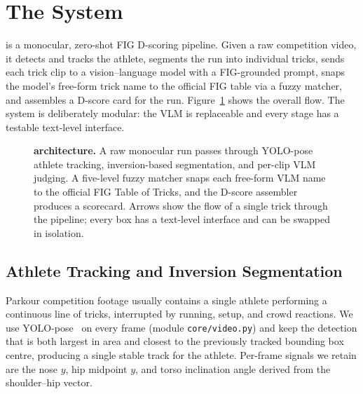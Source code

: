 \section{The \sys{} System}
\label{sec:system}

\sys{} is a monocular, zero-shot FIG D-scoring pipeline. Given a raw
competition video, it detects and tracks the athlete, segments the run into
individual tricks, sends each trick clip to a vision--language model with
a FIG-grounded prompt, snaps the model's free-form trick name to the official
FIG table via a fuzzy matcher, and assembles a D-score card for the run.
Figure~\ref{fig:architecture} shows the overall flow. The system is
deliberately modular: the VLM is replaceable and every stage has a testable
text-level interface.

\begin{figure}[t]
  \centering
  
  \caption{\textbf{\sys{} architecture.} A raw monocular run passes through
  YOLO-pose athlete tracking, inversion-based segmentation, and per-clip VLM
  judging. A five-level fuzzy matcher snaps each free-form VLM name to the
  official FIG Table of Tricks, and the D-score assembler produces a
  scorecard. Arrows show the flow of a single trick through the pipeline;
  every box has a text-level interface and can be swapped in isolation.}
  \label{fig:architecture}
\end{figure}

\subsection{Athlete Tracking and Inversion Segmentation}
\label{sec:system:segmentation}

Parkour competition footage usually contains a single athlete performing a
continuous line of tricks, interrupted by running, setup, and crowd
reactions. We use YOLO-pose~\cite{jocher2023yolo} on every frame (module
\texttt{core/video.py}) and keep the detection that is both largest in area
and closest to the previously tracked bounding box centre, producing a
single stable track for the athlete. Per-frame signals we retain are the
nose $y$, hip midpoint $y$, and torso inclination angle derived from the
shoulder--hip vector.

